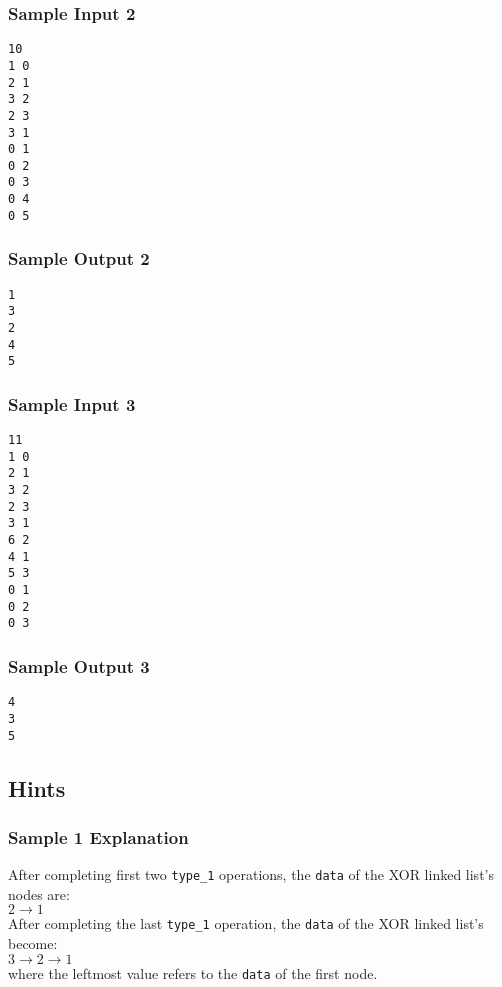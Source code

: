 \begin{multicols}{2}
\subsubsection{Sample Input 2}\label{sample-input-2}
\begin{verbatim}
10
1 0
2 1
3 2
2 3
3 1
0 1
0 2
0 3
0 4
0 5
\end{verbatim}

\columnbreak

\subsubsection{Sample Output 2}\label{sample-output-2}
\begin{verbatim}
1 
3 
2 
4 
5
\end{verbatim}
\end{multicols}

\begin{multicols}{2}
\subsubsection{Sample Input 3}\label{sample-input-3}
\begin{verbatim}
11
1 0
2 1
3 2
2 3
3 1
6 2
4 1
5 3
0 1
0 2
0 3
\end{verbatim}
    
\columnbreak
    
\subsubsection{Sample Output 3}\label{sample-output-3}
\begin{verbatim}
4
3
5
\end{verbatim}
\end{multicols}

\subsection{Hints}\label{hints}

\subsubsection{Sample 1 Explanation}\label{sample-1-explanation}

After completing first two \texttt{type\_1} operations, the \texttt{data} of the XOR linked list's nodes are: \\
$2\rightarrow 1$ \\
After completing the last \texttt{type\_1} operation, the \texttt{data} of the XOR linked list's become: \\
$3\rightarrow 2\rightarrow 1$ \\
where the leftmost value refers to the \texttt{data} of the first node.

